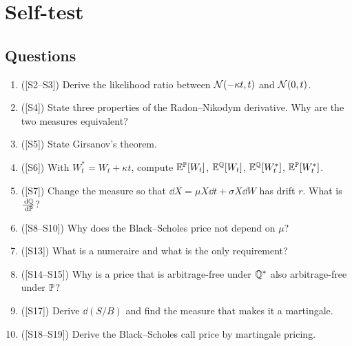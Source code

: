 \documentclass[10pt]{article}
\begin{document}
\section{Self-test}
\subsection*{Questions}
\begin{enumerate}[label=Q\arabic*.]
\item ([S2--S3]) Derive the likelihood ratio between $\mathcal{N}(-\kappa t,t)$ and $\mathcal{N}(0,t)$.
\item ([S4]) State three properties of the Radon--Nikodym derivative. Why are the two measures equivalent?
\item ([S5]) State Girsanov's theorem.
\item ([S6]) With $W^*_t=W_t+\kappa t$, compute $\mathbb{E}^{\mathbb{P}}[W_t]$, $\mathbb{E}^{\mathbb{Q}}[W_t]$, $\mathbb{E}^{\mathbb{Q}}[W^*_t]$, $\mathbb{E}^{\mathbb{P}}[W^*_t]$.
\item ([S7]) Change the measure so that $\dd X=\mu X\dd t+\sigma X\dd W$ has drift $r$. What is $\frac{\,\mathrm{d}\mathbb{Q}}{\,\mathrm{d}\mathbb{P}}$?
\item ([S8--S10]) Why does the Black--Scholes price not depend on $\mu$?
\item ([S13]) What is a numeraire and what is the only requirement?
\item ([S14--S15]) Why is a price that is arbitrage-free under $\mathbb{Q}^*$ also arbitrage-free under $\mathbb{P}$?
\item ([S17]) Derive $\dd(S/B)$ and find the measure that makes it a martingale.
\item ([S18--S19]) Derive the Black--Scholes call price by martingale pricing.
\end{enumerate}
\end{document}
